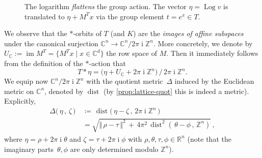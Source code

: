 \documentclass[10pt,a4paper]{article}
\theoremstyle{definition}
\DeclareMathOperator{\ii}{i}
\DeclareMathOperator{\Log}{Log}
\DeclareMathOperator{\dist}{dist}
\DeclareMathOperator{\ran}{im}
\newcommand{\CC}{\mathbb{C}}
\newcommand{\ZZ}{\mathbb{Z}}
\newcommand{\RR}{\mathbb{R}}
\numberwithin{equation}{section}
\begin{document}
\begin{figure}[ht]
\caption{\small The logarithm \textit{flattens} the group action.
 The vector $\eta=\Log v$ is translated to $\eta+M^T x$ via the group element $t= e^{x}\in T$.}%
 \label{fig:flatten-action}
\end{figure}

We observe that the $\ast$-orbits of $T$ (and $K$) are the
\textit{images of affine subspaces}
under the canonical surjection $\CC^n\rightarrow\CC^n/2\pi\ii\ZZ^n$.
More concretely, we denote by
$U_\CC:=\ran M^T = \{M^T x \mid x\in \CC^d\}$
the row space of $M$.
Then it immediately follows from the definition of the $\ast$-action that
\begin{equation}\label{eq:row-space}
	T\ast\eta = \Big(\eta + U_\CC +2\pi\ii\ZZ^n\Big)\,\big/\,2\pi\ii\ZZ^n .
\end{equation}
We equip now $\CC^n/2\pi\ii\ZZ^n$ with the quotient metric~$\Delta$
induced by the Euclidean metric on $\CC^n$, denoted by $\dist$
(by \cref{prop:lattice-quot} this is indeed a metric).
Explicitly,
\begin{equation}
\label{eq:delta}
	\begin{split}
	\Delta\big(\, \eta\, ,\, \zeta\, \big)\, &\coloneqq\, \dist\big(\, \eta-\zeta \, ,\, 2\pi\ii\ZZ^n \, \big)\\
	&=\sqrt{\Vert\, \rho-\tau\,\Vert^2 \, +\,4\pi^2\, \dist^2\left(\,\theta-\phi\,,\, \ZZ^n\right)}\, ,
\end{split}
\end{equation}
where $\eta=\rho+2\pi\ii\theta$ and $\zeta=\tau+2\pi\ii\phi$
with $\rho,\theta,\tau,\phi\in\RR^n$
(note that the imaginary parts~$\theta,\phi$ are only determined modulo $\ZZ^n$).
\end{document}
